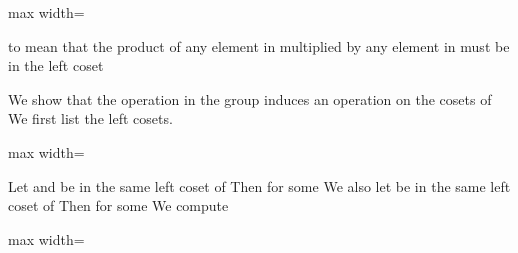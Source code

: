 \documentclass[11pt,oneside]{article}
\begin{document}
\begin{BookBody}

\begin{center}\begin{adjustbox}{max width=\linewidth}\end{adjustbox}\end{center}

\noindent to mean that the product of any element in  multiplied by any element in  must be in the left coset 

 We show that the operation \BookInline{+ } in the group  induces an operation on the cosets of  We first list the left cosets.

\begin{center}\begin{adjustbox}{max width=\linewidth}\end{adjustbox}\end{center}

\noindent Let  and  be in the same left coset of  Then  for some  We also let  be in the same left coset of  Then  for some  We compute 

\begin{center}\begin{adjustbox}{max width=\linewidth}\end{adjustbox}\end{center}


\end{BookBody}
\end{document}
